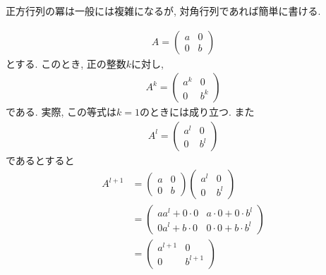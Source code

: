 正方行列の冪は一般には複雑になるが,
対角行列であれば簡単に書ける.
\begin{example}
  \label{eg:diag:power}
  \begin{align*}
    A=\begin{pmatrix}a&0\\0&b\end{pmatrix}
  \end{align*}
  とする. このとき, 正の整数$k$に対し,
  \begin{align*}
    A^k=\begin{pmatrix}a^k&0\\0&b^k\end{pmatrix}
  \end{align*}
  である.
  実際, この等式は$k=1$のときには成り立つ.
  また
  \begin{align*}
    A^l=\begin{pmatrix}a^{l}&0\\0&b^{l} \end{pmatrix}
  \end{align*}
  であるとすると
  \begin{align*}
    A^{l+1}
    &=
    \begin{pmatrix}a&0\\0&b\end{pmatrix}
      \begin{pmatrix}a^{l}&0\\0&b^{l} \end{pmatrix}
\\
      &=
\begin{pmatrix}aa^{l}+0\cdot 0&a\cdot 0+0\cdot b^l\\
  0a^{l}+b\cdot 0&0\cdot 0+b\cdot b^l
\end{pmatrix}    
\\
&=\begin{pmatrix}a^{l+1}&0\\0&b^{l+1} \end{pmatrix}
\end{align*}
\end{example}


